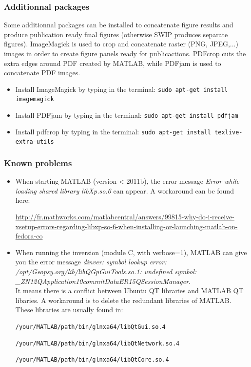 \documentclass[twoside,a4paper]{article}
\begin{document}
\subsubsection{Additionnal packages}
Some additionnal packages can be installed to concatenate figure results and produce publication ready final figures (otherwise SWIP produces separate figures). ImageMagick is used to crop and concatenate raster (PNG, JPEG,...) images in order to create figure panels ready for publicactions. PDFcrop cuts the extra edges around PDF created by MATLAB, while PDFjam is used to concatenate PDF images.
\begin{itemize}
\setlength\itemsep{2ex}
\item Install ImageMagick by typing in the terminal: \verb|sudo apt-get install imagemagick|
\item Install PDFjam by typing in the terminal: \verb|sudo apt-get install pdfjam|
\item Install pdfcrop by typing in the terminal: \verb|sudo apt-get install texlive-extra-utils|
\end{itemize}

\subsubsection{Known problems}
\begin{itemize}
\setlength\itemsep{2ex}
\setlength{\parindent}{5ex}
\item When starting MATLAB (version < 2011b), the error message \textit{Error while loading shared library libXp.so.6} can appear. A workaround can be found here:

\url{http://fr.mathworks.com/matlabcentral/answers/99815-why-do-i-receive-xsetup-errors-regarding-libxp-so-6-when-installing-or-launching-matlab-on-fedora-co}

\item When running the inversion (module C, with verbose=1), MATLAB can give you the error message \textit{dinver: symbol lookup error: /opt/Geopsy.org/lib/libQGpGuiTools.so.1: undefined symbol: \_ZN12QApplication10commitDataER15QSessionManager}.\\[1ex]
It means there is a conflict between Ubuntu QT libraries and MATLAB QT libaries. A workaround is to delete the redundant libraries of MATLAB. These libraries are usually found in:

\verb|/your/MATLAB/path/bin/glnxa64/libQtGui.so.4|

\verb|/your/MATLAB/path/bin/glnxa64/libQtNetwork.so.4|

\verb|/your/MATLAB/path/bin/glnxa64/libQtCore.so.4|
\end{itemize}
\end{document}
